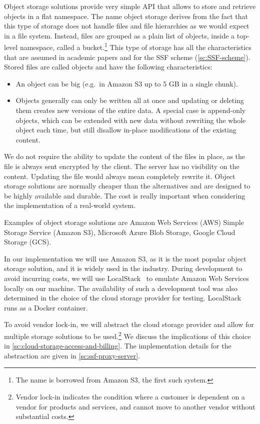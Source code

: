Object storage solutions provide
very simple API that allows to store and retrieve
objects in a flat namespace.
The name object storage derives from the fact that this type
of storage does not handle files and file hierarchies 
as we would expect in a file system. Instead,
files are grouped as a plain list of objects,
inside a top-level namespace, called a bucket.\footnote{The name is borrowed from Amazon S3, the first such system.}
This type of storage has all the characteristics that are assumed
in academic papers and
for the SSF scheme (\cref{sc:SSF-scheme}).
Stored files are called objects and have the following characteristics:
\begin{itemize}
    \item An object can be big (e.g.\ in Amazon S3 up to 5 GB in a single chunk).
    \item Objects generally can only be written all at once and updating or deleting them creates new versions of the entire data. A special case is append-only objects, which can be extended with new data without rewriting the whole object each time, but still disallow in-place modifications of the existing content.
\end{itemize} 

We do not require the ability to update the content of the files in place,
as the file is always sent encrypted by the client. 
The server has no visibility on the content. 
Updating the file
would always mean completely rewrite it.
Object storage solutions are normally cheaper than the alternatives
and are designed to be highly available and durable.
The cost is really important when considering the implementation
of a real-world system.

Examples of object storage solutions are Amazon Web Services (AWS)
Simple Storage Service (Amazon S3), Microsoft Azure Blob Storage, Google Cloud Storage (GCS).

In our implementation we will use Amazon S3, as it is the most
popular object storage solution, and it is widely used in the industry.
During development to avoid incurring costs, we will use LocalStack~\cite{LocalStack}
to emulate Amazon Web Services locally on our machine. The availability
of such a development tool was also determined in the choice
of the cloud storage provider for testing. LocalStack
runs as a Docker container.

To avoid vendor lock-in, we will abstract the cloud storage provider
and allow for multiple storage solutions to be used.\footnote{Vendor lock-in indicates the condition where a customer is dependent on a vendor for products and services, and cannot move to another vendor without substantial costs.}
We discuss the implications of this choice in \cref{sc:cloud-storage-access-and-billing}.
The implementation details for the abstraction are given in \cref{sc:ssf-proxy-server}.


